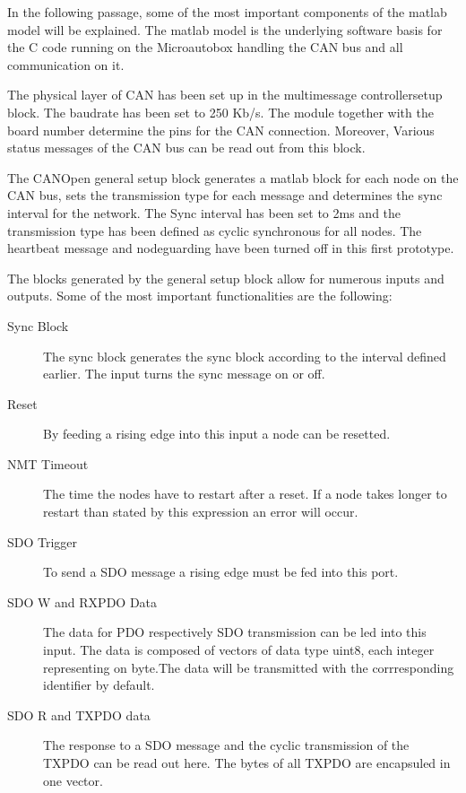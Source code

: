 In the following passage, some of the most important components of the matlab model will be explained. The matlab model is the underlying software basis for the C code running on the Microautobox handling the CAN bus and all communication on it.

The physical layer of CAN has been set up in the multimessage controllersetup block. The baudrate has been set to 250 Kb/s. The module together with the board number determine the pins for the CAN connection. Moreover, Various status messages of the CAN bus can be read out from this block.

The CANOpen general setup block generates a matlab block for each node on the CAN bus, sets the transmission type for each message and determines the sync interval for the network. The Sync interval has been set to 2ms and the transmission type has been defined as cyclic synchronous for all nodes. The heartbeat message and nodeguarding have been turned off in this first prototype.

The blocks generated by the general setup block allow for numerous inputs and outputs. Some of the most important functionalities are the following:

\begin{description}
	\item[Sync Block]
	The sync block generates the sync block according to the interval defined earlier. The input turns the sync message on or off.
	\item[Reset] 
	By feeding a rising edge into this input a node can be resetted. 
	\item[NMT Timeout]
	The time the nodes have to restart after a reset. If a node takes longer to restart than stated by this expression an error will occur.
	\item[SDO Trigger]
	To send a SDO message a rising edge must be fed into this port.  
	\item[SDO W and RXPDO Data] 
	The data for PDO respectively SDO transmission can be led into this input. The data is composed of vectors of data type uint8, each integer representing on byte.The data will be transmitted with the corrresponding identifier by default.
	\item[SDO R and TXPDO data] 
	The response to a SDO message and the cyclic transmission of the TXPDO can be read out here. The bytes of all TXPDO are encapsuled in one vector.
	
\end{description}

